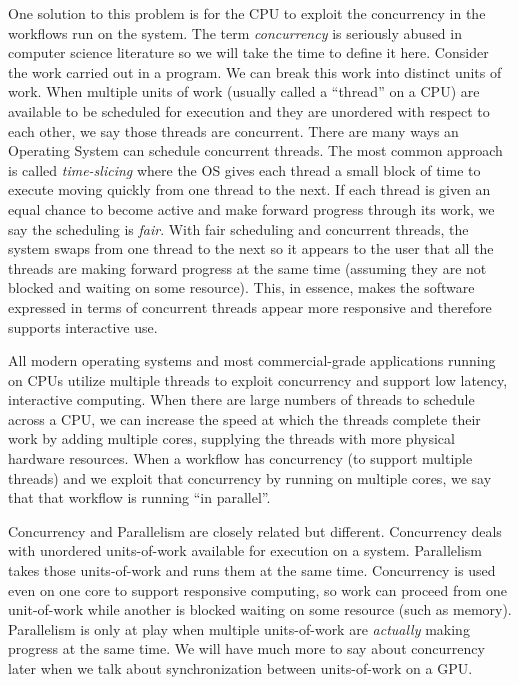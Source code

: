 One solution to this problem is for the CPU to exploit the concurrency in the workflows run on the system.
The term \emph{concurrency} is seriously abused in computer science literature so we will
take the time to define it here.   Consider the work carried out in a program.   We can break this work into 
distinct units of work.  When multiple units of work (usually called a ``thread'' on a CPU) are 
available to be scheduled for execution and they are unordered with respect to each other, we say those threads are concurrent.  
There are many ways an Operating System can schedule concurrent threads.  
The most common approach is called \emph{time-slicing} where the OS gives
each thread a small block of time to execute moving quickly from one thread to the next.  
If each thread is given an equal chance
to become active and make forward progress through its work, we say the scheduling is \emph{fair}.  With fair scheduling
and concurrent threads, the system swaps from one thread to the next so it appears to the user that all the threads
are making forward progress at the same time (assuming they are not blocked and waiting on some resource).   This, in essence, makes the
software expressed in terms of concurrent threads appear more responsive and therefore supports interactive use.

All modern operating systems and most commercial-grade applications running on CPUs utilize multiple threads to
exploit concurrency and support low latency, interactive computing.  When there are large numbers
of threads to schedule across a CPU, we can increase the speed at which the threads complete their work by adding multiple 
cores, supplying the threads with more physical hardware resources.  When a workflow has concurrency (to support multiple threads) and we exploit that concurrency by running on 
multiple cores, we say that that workflow is running ``in parallel''.  

Concurrency and Parallelism are closely related but 
different.  Concurrency deals with unordered units-of-work available for execution on a system.  Parallelism takes those  
units-of-work and runs them at the same time.  Concurrency is used even on one core to support 
responsive computing, so work can proceed from one unit-of-work while another is blocked waiting on some resource (such as 
memory).  Parallelism is only at play when multiple units-of-work are \emph{actually} making progress at the same time.  We will have 
much more to say about concurrency later when we talk about synchronization between units-of-work on a GPU.

